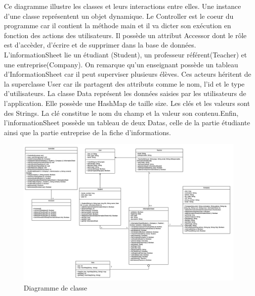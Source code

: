 \documentclass{scrreprt}
\begin{document}
Ce diagramme illustre les classes et leurs interactions entre elles. Une instance d'une classe représentent un objet dynamique. Le Controller est le coeur du programme car il contient la méthode main et il va dicter son exécution en fonction des actions des utilisateurs. Il possède un attribut Accessor dont le rôle est d'accèder, d'écrire et de supprimer dans la base de données. L'informationSheet lie un étudiant (Student), un professeur référent(Teacher) et une entreprise(Company). On remarque qu'un enseignant possède un tableau d'InformationSheet car il peut superviser plusieurs élèves. Ces acteurs héritent de la superclasse User car ils partagent des attributs comme le nom, l'id et le type d'utilisateurs. La classe Data représent les données saisies par les utilisateurs de l'application. Elle possède une HashMap de taille size. Les clés et les valeurs sont des Strings. La clé constitue le nom du champ et la valeur son contenu.Enfin, l'informationSheet possède un tableau de deux Datas, celle de la partie étudiante ainsi que la partie entreprise de la fiche d'informations.

\begin{figure}[!h]
\centering
\includegraphics[width=14cm]{images/classDiagram.png}
\caption{Diagramme de classe}
\end{figure}
\end{document}
